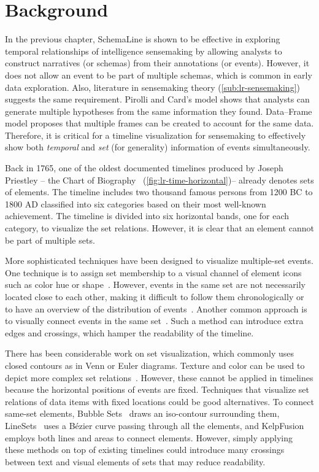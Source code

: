 \section{Background}
In the previous chapter, SchemaLine is shown to be effective in exploring temporal relationships of intelligence sensemaking by allowing analysts to construct narratives (or schemas) from their annotations (or events). However, it does not allow an event to be part of multiple schemas, which is common in early data exploration. Also, literature in sensemaking theory (\autoref{sub:lr-sensemaking})  suggests the same requirement. Pirolli and Card's model shows that analysts can generate multiple hypotheses from the same information they found. Data--Frame model proposes that multiple frames can be created to account for the same data. Therefore, it is critical for a timeline visualization for sensemaking to effectively show both \emph{temporal} and \emph{set} (for generality) information of events simultaneously.

Back in 1765, one of the oldest documented timelines produced by Joseph Priestley -- the Chart of Biography~\cite{Priestley1765} (\autoref{fig:lr-time-horizontal})-- already denotes sets of elements. The timeline includes two thousand famous persons from 1200 BC to 1800 AD classified into six categories based on their most well-known achievement. The timeline is divided into six horizontal bands, one for each category, to visualize the set relations. However, it is clear that an element cannot be part of multiple sets.

More sophisticated techniques have been designed to visualize multiple-set events. One technique is to assign set membership to a visual channel of element icons such as color hue or shape~\cite{TimeGlider2016}. However, events in the same set are not necessarily located close to each other, making it difficult to follow them chronologically or to have an overview of the distribution of events~\cite{SimileTimeline2009,TimeGlider2016}. Another common approach is to visually connect events in the same set~\cite{Kumar1998}. Such a method can introduce extra edges and crossings, which hamper the readability of the timeline.

There has been considerable work on set visualization, which commonly uses closed contours as in Venn or Euler diagrams. Texture and color can be used to depict more complex set relations~\cite{Ware2013}. However, these cannot be applied in timelines because the horizontal positions of events are fixed. Techniques that visualize set relations of data items with fixed locations could be good alternatives. To connect same-set elements, Bubble Sets~\cite{Collins2009a} draws an iso-contour surrounding them, LineSets~\cite{Alper2011} uses a B\'{e}zier curve passing through all the elements, and KelpFusion~\cite{Meulemans2013} employs both lines and areas to connect elements. However, simply applying these methods on top of existing timelines could introduce many crossings between text and visual elements of sets that may reduce readability.

